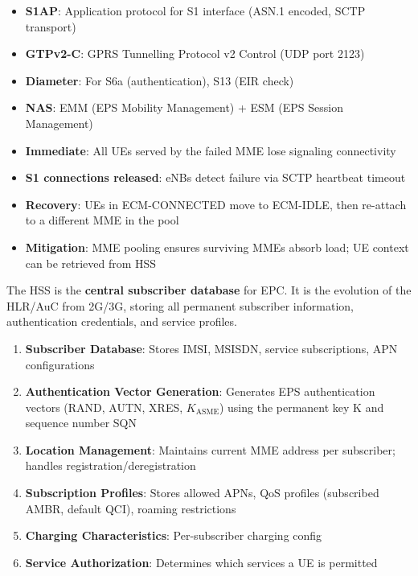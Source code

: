 
\begin{itemize}
\tightlist
\item
  \textbf{S1AP}: Application protocol for S1 interface (ASN.1 encoded, SCTP transport)
\item
  \textbf{GTPv2-C}: GPRS Tunnelling Protocol v2 Control (UDP port 2123)
\item
  \textbf{Diameter}: For S6a (authentication), S13 (EIR check)
\item
  \textbf{NAS}: EMM (EPS Mobility Management) + ESM (EPS Session Management)
\end{itemize}


\begin{itemize}
\tightlist
\item
  \textbf{Immediate}: All UEs served by the failed MME lose signaling connectivity
\item
  \textbf{S1 connections released}: eNBs detect failure via SCTP heartbeat timeout
\item
  \textbf{Recovery}: UEs in ECM-CONNECTED move to ECM-IDLE, then re-attach to a different MME in the pool
\item
  \textbf{Mitigation}: MME pooling ensures surviving MMEs absorb load; UE context can be retrieved from HSS
\end{itemize}



\CNchained{}

The HSS is the \textbf{central subscriber database} for EPC. It is the evolution of the HLR/\allowbreak{}AuC from 2G/\allowbreak{}3G, storing all permanent subscriber information, authentication credentials, and service profiles.


\begin{enumerate}
\def\labelenumi{\arabic{enumi}.}
\tightlist
\item
  \textbf{Subscriber Database}: Stores IMSI, MSISDN, service subscriptions, APN configurations
\item
  \textbf{Authentication Vector Generation}: Generates EPS authentication vectors (RAND, AUTN, XRES, \ensuremath{K_{\mathrm{ASME}}}) using the permanent key K and sequence number SQN
\item
  \textbf{Location Management}: Maintains current MME address per subscriber; handles registration/\allowbreak{}deregistration
\item
  \textbf{Subscription Profiles}: Stores allowed APNs, QoS profiles (subscribed AMBR, default QCI), roaming restrictions
\item
  \textbf{Charging Characteristics}: Per-subscriber charging config
\item
  \textbf{Service Authorization}: Determines which services a UE is permitted
\end{enumerate}

